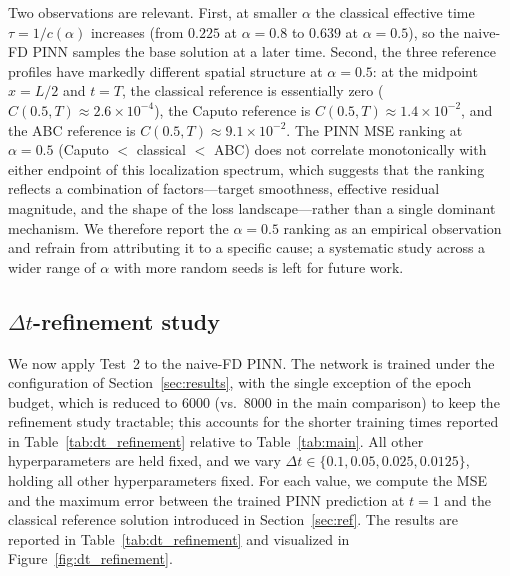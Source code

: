 \documentclass[11pt]{article}
\begin{document}
Two observations are relevant. First, at smaller \(\alpha\) the classical effective time \(\tau = 1/c(\alpha)\) increases (from \(0.225\) at \(\alpha=0.8\) to \(0.639\) at \(\alpha=0.5\)), so the naive-FD PINN samples the base solution at a later time. Second, the three reference profiles have markedly different spatial structure at \(\alpha=0.5\): at the midpoint \(x=L/2\) and \(t=T\), the classical reference is essentially zero (\(C(0.5,T)\approx 2.6\times 10^{-4}\)), the Caputo reference is \(C(0.5,T)\approx 1.4\times 10^{-2}\), and the ABC reference is \(C(0.5,T)\approx 9.1\times 10^{-2}\). The PINN MSE ranking at \(\alpha=0.5\) (Caputo \(<\) classical \(<\) ABC) does not correlate monotonically with either endpoint of this localization spectrum, which suggests that the ranking reflects a combination of factors---target smoothness, effective residual magnitude, and the shape of the loss landscape---rather than a single dominant mechanism. We therefore report the \(\alpha=0.5\) ranking as an empirical observation and refrain from attributing it to a specific cause; a systematic study across a wider range of \(\alpha\) with more random seeds is left for future work.

\subsection{\(\Delta t\)-refinement study}
\label{sec:dt_refinement_study}

We now apply Test~2 to the naive-FD PINN. The network is trained under the configuration of Section~\ref{sec:results}, with the single exception of the epoch budget, which is reduced to 6000 (vs.\ 8000 in the main comparison) to keep the refinement study tractable; this accounts for the shorter training times reported in Table~\ref{tab:dt_refinement} relative to Table~\ref{tab:main}. All other hyperparameters are held fixed, and we vary \(\Delta t \in
\{0.1, 0.05, 0.025, 0.0125\}\), holding all other hyperparameters fixed.
For each value, we compute the MSE and the maximum error between the
trained PINN prediction at \(t=1\) and the classical reference solution
introduced in Section~\ref{sec:ref}. The results are reported in
Table~\ref{tab:dt_refinement} and visualized in
Figure~\ref{fig:dt_refinement}.
\end{document}
